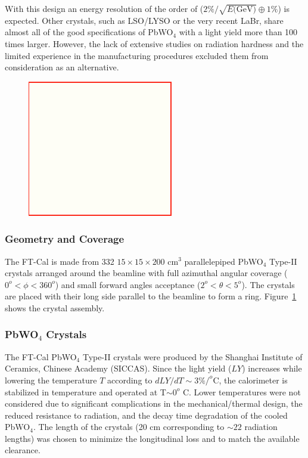 With this design
 an energy resolution of the order of
($2\% /\sqrt{E\textrm{(GeV)}} \oplus 1\%$) is expected.
Other crystals, such as LSO/LYSO or the very recent LaBr, share almost all of the good specifications of PbWO$_4$ with a light yield more than 100 times larger. However, the lack of extensive studies on radiation hardness and the limited experience in the manufacturing procedures excluded them from consideration as an alternative.

\begin{figure}[th!]
\centering 
\includegraphics[width=0.85\columnwidth]{fig/dummy.png} 
\caption{} 
\label{fig:ft-cal-geometry} 
\end{figure}

\subsubsection{Geometry and Coverage}
The FT-Cal is made from 332 $15\times 15\times 200$ cm$^3$ parallelepiped PbWO$_4$ Type-II crystals arranged around the beamline  with full azimuthal angular coverage ($0^o<\phi<360^o$)   and small forward angles  acceptance ($2^o<\theta<5^o$). The crystals are placed with their long side parallel to the beamline to form a ring. Figure~\ref{fig:ft-cal-geometry} shows the crystal assembly. 

\subsubsection{PbWO$_4$ Crystals}
The FT-Cal PbWO$_4$ Type-II crystals were produced by the Shanghai Institute of Ceramics, Chinese Academy (SICCAS). Since the light yield ($LY$) increases while lowering the temperature $T$ according to $dLY/dT \sim 3\%/^o\textrm{C}$, the calorimeter is stabilized in temperature and operated at T$\sim 0 ^o\textrm{ C}$. Lower temperatures were not considered due to significant complications in the mechanical/thermal design,  the reduced resistance to radiation,  and the decay time degradation of the  cooled PbWO$_4$.
The length of the crystals (20 cm corresponding to $\sim22$  radiation lengths) was chosen to minimize the longitudinal loss and to match the available clearance.


